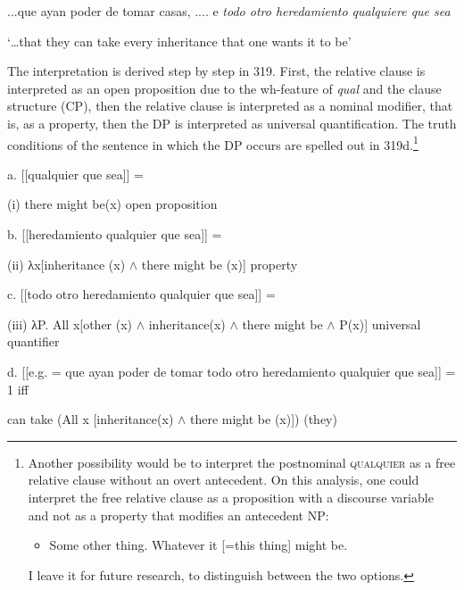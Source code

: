 \documentclass[output=paper]{langscibook}
\begin{document}
  ...que ayan poder de tomar casas, .... e \textit{todo otro heredamiento qualquiere que sea}

  ‘…that they can take every inheritance that one wants it to be’ 

The interpretation is derived step by step in 319. First, the relative clause is interpreted as an open proposition due to the wh-feature of \textit{qual} and the clause structure (CP), then the relative clause is interpreted as a nominal modifier, that is, as a property, then the DP is interpreted as universal quantification. The truth conditions of the sentence in which the DP occurs are spelled out in 319d.\footnote{ \textrm{Another possibility would be to interpret the postnominal} \textrm{\textsc{qualquier}} \textrm{as a free relative clause without an overt antecedent. On this analysis, one could interpret the free relative clause as a proposition with a discourse variable and not as a property that modifies an antecedent NP:}

\begin{itemize}
\item \begin{styleFootnote}
\textrm{Some other thing. Whatever it [=this thing] might be.}
\end{styleFootnote}
\end{itemize}
\textrm{I leave it for future research, to distinguish between the two options.} }

\begin{styleAuthor}
  a.  [[qualquier que sea]] =  
\end{styleAuthor}

\begin{styleAuthor}
    (i) there might be(x)  open proposition
\end{styleAuthor}

  b.  [[heredamiento qualquier que sea]] =  

    (ii) λx[inheritance (x) ${\wedge}$ there might be (x)]  property

  c.  [[todo otro heredamiento qualquier que sea]] =  

    (iii) λP. All x[other (x) ${\wedge}$ inheritance(x) ${\wedge}$ there might be ${\wedge}$ P(x)]  universal quantifier

  d.  [[e.g.  = que ayan poder de tomar todo otro heredamiento qualquier que sea]] = 1 iff  

    can take (All x [inheritance(x) ${\wedge}$ there might be (x)]) (they)  
\end{document}
